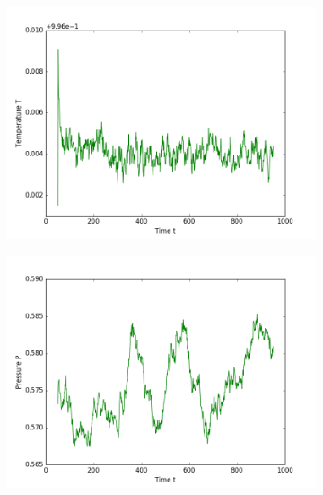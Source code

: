 \begin{figure}[ht]
\begin{subfigure}{0.3\textwidth}
\includegraphics[width=\textwidth]{fig/avTemperature_T1d0_M100.png}
\end{subfigure}
\hfill
\begin{subfigure}{0.3\textwidth}
\includegraphics[width=\textwidth]{fig/avPressure_T1d0_M100.png}
\end{subfigure}
\hfill
\begin{subfigure}{0.3\textwidth}

\end{subfigure}
\end{figure}

